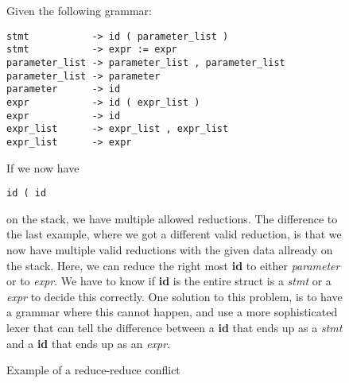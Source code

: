 \documentclass{article}
\begin{document}
\begin{figure}[h]
\caption{Example of a reduce-reduce conflict}
Given the following grammar:
\begin{lstlisting}
stmt           -> id ( parameter_list )
stmt           -> expr := expr
parameter_list -> parameter_list , parameter_list
parameter_list -> parameter
parameter      -> id
expr           -> id ( expr_list )
expr           -> id
expr_list      -> expr_list , expr_list
expr_list      -> expr 
\end{lstlisting}
If we now have
\begin{lstlisting}
id ( id
\end{lstlisting}

on the stack, we have multiple allowed reductions. The difference to the last
example, where we got a different valid reduction, is that we now have multiple
valid reductions with the given data allready on the stack. Here, we can reduce
the right most \textbf{id} to either \textit{parameter} or to  \textit{expr}. We
have to know if \textbf{id} is the entire struct is a \textit{stmt} or a
\textit{expr} to decide this correctly. One solution to this problem, is to have
a grammar where this cannot happen, and use a more sophisticated lexer that can
tell the difference between a \textbf{id} that ends up as a \textit{stmt} and a
 \textbf{id} that ends up as an \textit{expr}.
\end{figure}
\end{document}
